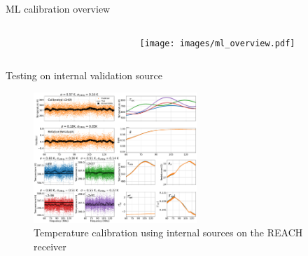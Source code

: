 \documentclass[aspectratio=169]{beamer}
\begin{document}
\begin{frame}{\small{ML calibration overview}}
	\begin{columns}
		\begin{column}{0.48\textwidth}
			\begin{figure}
				\centering
				
			\end{figure}
		\end{column}

		\begin{column}{0.48\textwidth}
			\begin{figure}
				\centering
				\texttt{[image: images/ml\_overview.pdf]}
			\end{figure}
		\end{column}
	\end{columns}
\end{frame}

%
% 				

\begin{frame}{\small{Testing on internal validation source}}
    \begin{figure}
        \centering
        \includegraphics[width=0.55\textwidth]{images/temps.pdf}
        \caption{Temperature calibration using internal sources on the REACH 
        receiver}
    \end{figure}
\end{frame}
\end{document}
